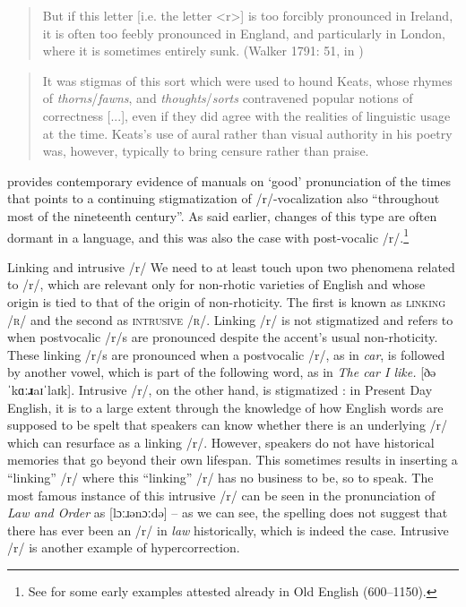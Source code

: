 \begin{quote}
    But if this letter {[}i.e. the letter <r>{]} is too forcibly pronounced in Ireland, it is often too feebly pronounced in England, and particularly in London, where it is sometimes entirely sunk. (Walker 1791: 51, in \citealp[153]{Beal2004})
\end{quote}

\begin{quote}
    It was stigmas of this sort which were used to hound Keats, whose rhymes of \textit{thorns}/\textit{fawns}, and \textit{thoughts}/\textit{sorts} contravened popular notions of correctness [...], even if they did agree with the realities of linguistic usage at the time. Keats's use of aural rather than visual authority in his poetry was, however, typically to bring censure rather than praise. \citep[101--102]{Mugglestone2003}
\end{quote}

\noindent \citet[154]{Beal2004} provides contemporary evidence of manuals on ‘good' pronunciation of the times that points to a continuing stigmatization of /r/-vocalization also ``throughout most of the nineteenth century''. As said earlier, changes of this type are often dormant in a language, and this was also the case with post-vocalic /r/.\footnote{See \citet{Minkova2014} for some early examples attested already in Old English (600--1150).}


\begin{soundbox}{Linking and intrusive /r/}
We need to at least touch upon two phenomena related to /r/, which are relevant only for non-rhotic varieties of English and whose origin is tied to that of the origin of non-rhoticity. The first is known as \textsc{linking /r/} and the second as \textsc{intrusive /r/}. Linking /r/ is not stigmatized and refers to when postvocalic /r/s are pronounced despite the accent's usual non-rhoticity. These linking /r/s are pronounced when a postvocalic /r/, as in \textit{car}, is followed by another vowel, which is part of the following word, as in \textit{The car I like.} {[}ðəˈkɑː\textbf{ɹ}aɪˈlaɪk{]}. Intrusive /r/, on the other hand, is stigmatized {\citep[127]{Minkova2014}}: in Present Day English, it is to a large extent through the knowledge of how English words are supposed to be spelt that speakers can know whether there is an underlying /r/ which can resurface as a linking /r/. However, speakers do not have historical memories that go beyond their own lifespan. This sometimes results in inserting a ``linking'' /r/ where this ``linking'' /r/ has no business to be, so to speak. The most famous instance of this intrusive /r/ can be seen in the pronunciation of \textit{Law and Order} as {[}lɔːɹənɔːdə{]} -- as we can see, the spelling does not suggest that there has ever been an /r/ in \textit{law} historically, which is indeed the case. Intrusive /r/ is another example of hypercorrection.
\end{soundbox}



